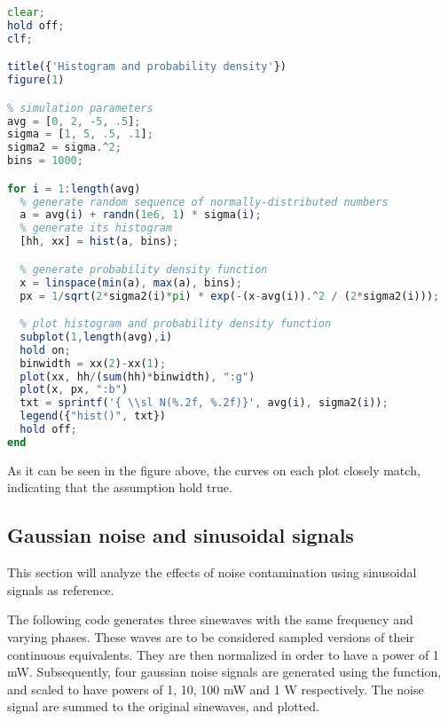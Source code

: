\begin{lstlisting}[language=Octave]
clear;
hold off;
clf;

title({'Histogram and probability density'})
figure(1)

% simulation parameters
avg = [0, 2, -5, .5];
sigma = [1, 5, .5, .1];
sigma2 = sigma.^2;
bins = 1000;

for i = 1:length(avg)
  % generate random sequence of normally-distributed numbers
  a = avg(i) + randn(1e6, 1) * sigma(i);
  % generate its histogram
  [hh, xx] = hist(a, bins);

  % generate probability density function
  x = linspace(min(a), max(a), bins);
  px = 1/sqrt(2*sigma2(i)*pi) * exp(-(x-avg(i)).^2 / (2*sigma2(i)));

  % plot histogram and probability density function
  subplot(1,length(avg),i)
  hold on;
  binwidth = xx(2)-xx(1);
  plot(xx, hh/(sum(hh)*binwidth), ":g")
  plot(x, px, ":b")
  txt = sprintf('{ \\sl N(%.2f, %.2f)}', avg(i), sigma2(i));
  legend({"hist()", txt})
  hold off;
end
\end{lstlisting}

As it can be seen in the figure above, the curves on each plot closely match, indicating that the assumption hold true.


\subsection{Gaussian noise and sinusoidal signals}
This section will analyze the effects of noise contamination using sinusoidal signals as reference.

The following code generates three sinewaves with the same frequency and varying phases.
These waves are to be considered sampled versions of their continuous equivalents.
They are then normalized in order to have a power of 1 mW.
Subsequently, four gaussian noise signals are generated using the  function, and scaled to have powers of 1, 10, 100 mW and 1 W respectively.
The noise signal are summed to the original sinewaves, and plotted.

